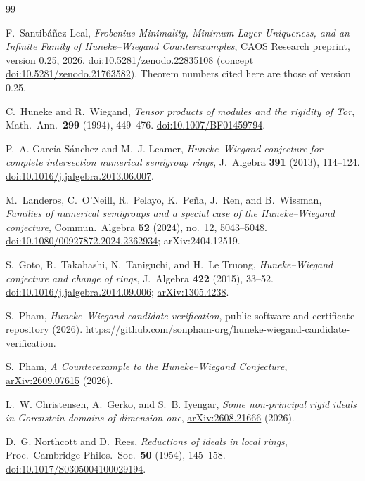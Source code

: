 \documentclass[11pt]{article}
\theoremstyle{definition}
\theoremstyle{remark}
\begin{document}
\begin{thebibliography}{99}
\raggedright
{}
F.~Santib\'a\~nez-Leal,
\emph{Frobenius Minimality, Minimum-Layer Uniqueness, and an Infinite Family
of Huneke--Wiegand Counterexamples}, CAOS Research preprint, version 0.25, 2026.
\href{https://doi.org/10.5281/zenodo.22835108}{doi:10.5281/zenodo.22835108}
(concept \href{https://doi.org/10.5281/zenodo.21763582}{doi:10.5281/zenodo.21763582}).
Theorem numbers cited here are those of version 0.25.

C.~Huneke and R.~Wiegand,
\emph{Tensor products of modules and the rigidity of Tor},
Math.\ Ann.\ \textbf{299} (1994), 449--476.
\href{https://doi.org/10.1007/BF01459794}{doi:10.1007/BF01459794}.

P.~A. Garc\'ia-S\'anchez and M.~J. Leamer,
\emph{Huneke--Wiegand conjecture for complete intersection numerical semigroup rings},
J.\ Algebra \textbf{391} (2013), 114--124.
\href{https://doi.org/10.1016/j.jalgebra.2013.06.007}{doi:10.1016/j.jalgebra.2013.06.007}.

M.~Landeros, C.~O'Neill, R.~Pelayo, K.~Pe\~na, J.~Ren, and B.~Wissman,
\emph{Families of numerical semigroups and a special case of the Huneke--Wiegand conjecture},
Commun.\ Algebra \textbf{52} (2024), no.~12, 5043--5048.
\href{https://doi.org/10.1080/00927872.2024.2362934}{doi:10.1080/00927872.2024.2362934};
arXiv:2404.12519.

S.~Goto, R.~Takahashi, N.~Taniguchi, and H.~Le Truong,
\emph{Huneke--Wiegand conjecture and change of rings},
J.\ Algebra \textbf{422} (2015), 33--52.
\href{https://doi.org/10.1016/j.jalgebra.2014.09.006}{doi:10.1016/j.jalgebra.2014.09.006};
\href{https://arxiv.org/abs/1305.4238}{arXiv:1305.4238}.

S.~Pham,
\emph{Huneke--Wiegand candidate verification}, public software and certificate repository (2026).
\url{https://github.com/sonpham-org/huneke-wiegand-candidate-verification}.

S.~Pham,
\emph{A Counterexample to the Huneke--Wiegand Conjecture},
\href{https://arxiv.org/abs/2609.07615}{arXiv:2609.07615} (2026).

L.~W. Christensen, A.~Gerko, and S.~B. Iyengar,
\emph{Some non-principal rigid ideals in Gorenstein domains of dimension one},
\href{https://arxiv.org/abs/2608.21666}{arXiv:2608.21666} (2026).

D.~G. Northcott and D.~Rees,
\emph{Reductions of ideals in local rings},
Proc.\ Cambridge Philos.\ Soc.\ \textbf{50} (1954), 145--158.
\href{https://doi.org/10.1017/S0305004100029194}{doi:10.1017/S0305004100029194}.


\end{thebibliography}
\end{document}
